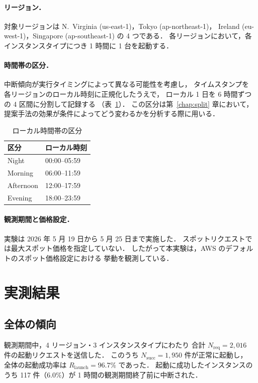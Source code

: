 \documentclass[11pt,a4paper]{ltjsreport}
\newcommand{\Rlaunch}{R_{\mathrm{launch}}}
\newcommand{\Nreq}{N_{\mathrm{req}}}
\newcommand{\Nsucc}{N_{\mathrm{succ}}}
\begin{document}
\paragraph{リージョン．}
対象リージョンは N.~Virginia (us-east-1)，Tokyo (ap-northeast-1)，
Ireland (eu-west-1)，Singapore (ap-southeast-1) の 4 つである．
各リージョンにおいて，各インスタンスタイプにつき 1 時間に 1 台を起動する．

\paragraph{時間帯の区分．}
中断傾向が実行タイミングによって異なる可能性を考慮し，
タイムスタンプを各リージョンのローカル時刻に正規化したうえで，
ローカル 1 日を 6 時間ずつの 4 区間に分割して記録する
（表~\ref{tab:periods}）．
この区分は第~\ref{chap:split} 章において，
提案手法の効果が条件によってどう変わるかを分析する際に用いる．

\begin{table}[htbp]
\centering
\caption{ローカル時間帯の区分}
\label{tab:periods}
\small
\begin{tabular}{@{}ll@{}}
\toprule
区分 & ローカル時刻 \\
\midrule
Night     & 00:00--05:59 \\
Morning   & 06:00--11:59 \\
Afternoon & 12:00--17:59 \\
Evening   & 18:00--23:59 \\
\bottomrule
\end{tabular}
\end{table}

\paragraph{観測期間と価格設定．}
実験は 2026 年 5 月 19 日から 5 月 25 日まで実施した．
スポットリクエストでは最大スポット価格を指定していない．
したがって本実験は，AWS のデフォルトのスポット価格設定における
挙動を観測している．

\section{実測結果}

\subsection{全体の傾向}

観測期間中，4 リージョン・3 インスタンスタイプにわたり
合計 $\Nreq = 2{,}016$ 件の起動リクエストを送信した．
このうち $\Nsucc = 1{,}950$ 件が正常に起動し，
全体の起動成功率は $\Rlaunch = 96.7\%$ であった．
起動に成功したインスタンスのうち 117 件（$6.0\%$）が
1 時間の観測期間終了前に中断された．
\end{document}
